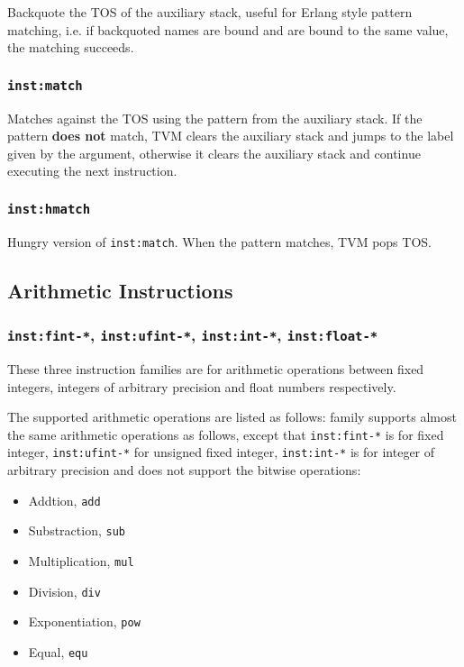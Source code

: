 \documentclass{article}
\newcommand{\inst}[1] {\texttt{inst:#1}}
\begin{document}
Backquote the TOS of the auxiliary stack, useful for Erlang style pattern matching, i.e. if backquoted names are bound and are bound to the same value, the matching succeeds.

\subsubsection{\inst{match}}

Matches against the TOS using the pattern from the auxiliary stack. If the pattern \textbf{does not} match, TVM clears the auxiliary stack and jumps to the label given by the argument, otherwise it clears the auxiliary stack and continue executing the next instruction.

\subsubsection{\inst{hmatch}}

Hungry version of \inst{match}. When the pattern matches, TVM pops TOS.

\subsection{Arithmetic Instructions}

\subsubsection{\inst{fint-*}, \inst{ufint-*}, \inst{int-*}, \inst{float-*}}

These three instruction families are for arithmetic operations between fixed integers, integers of arbitrary precision and float numbers respectively.

The supported arithmetic operations are listed as follows:
family supports almost the same arithmetic operations as follows, except that \inst{fint-*} is for fixed integer, \inst{ufint-*} for unsigned fixed integer, \inst{int-*} is for integer of arbitrary precision and does not support the bitwise operations:
\begin{itemize}
\item Addtion, \texttt{add}
\item Substraction, \texttt{sub}
\item Multiplication, \texttt{mul}
\item Division, \texttt{div}
\item Exponentiation, \texttt{pow}
\item Equal, \texttt{equ}
\end{itemize}
\end{document}
